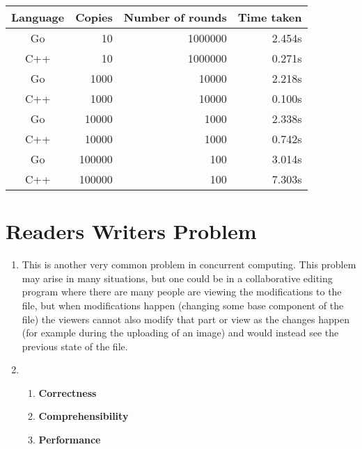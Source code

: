 \documentclass[11pt]{article}
\begin{document}
\begin{tabular}{c r r r}
Language    & Copies & Number of rounds & Time taken \\
\toprule
Go 			& 10 & 1000000 & 2.454s \\
C++         & 10 & 1000000 & 0.271s \\
\cmidrule{1-4}
Go 			& 1000 & 10000 & 2.218s \\
C++         & 1000 & 10000 & 0.100s \\
\cmidrule{1-4}
Go 			& 10000 & 1000 & 2.338s \\
C++         & 10000 & 1000 & 0.742s \\
\cmidrule{1-4}
Go 			& 100000 & 100 & 3.014s \\
C++         & 100000 & 100 & 7.303s \\
\end{tabular}

\pagebreak

\section{Readers Writers Problem}
\begin{enumerate}
	\item This is another very common problem in concurrent computing. This problem may arise in many situations, but one could be in a collaborative editing program where there are many people are viewing the modifications to the file, but when modifications happen (changing some base component of the file) the viewers cannot also modify that part or view as the changes happen (for example during the uploading of an image) and would instead see the previous state of the file.

	\item
	\begin{enumerate}
	\item \textbf{Correctness}\linebreak
	
	\item \textbf{Comprehensibility}\linebreak
	
	\item \textbf{Performance}\linebreak
	
	\end{enumerate}
\end{enumerate}
\end{document}
